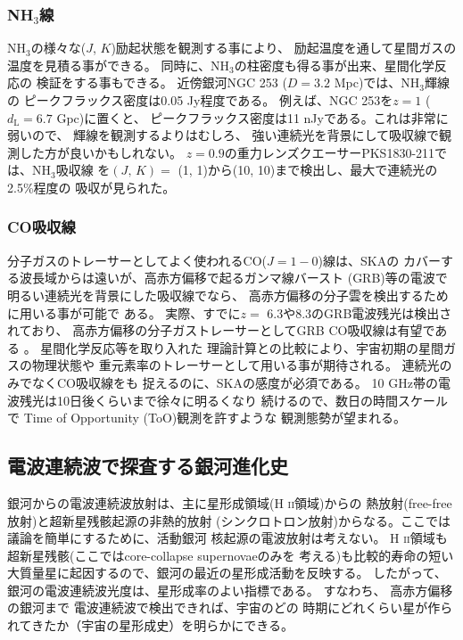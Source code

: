 \subsubsection{NH$_3$線}

NH$_3$の様々な($J$, $K$)励起状態を観測する事により、
励起温度を通して星間ガスの温度を見積る事ができる。
同時に、NH$_3$の柱密度も得る事が出来、星間化学反応の
検証をする事もできる。
近傍銀河NGC 253 ($D=3.2$ Mpc)では、NH$_3$輝線の
ピークフラックス密度は0.05 Jy程度である\citep{2005PASJ...57..549T}。
例えば、NGC 253を$z=1$ ($d_\mathrm{L}=6.7$ Gpc)に置くと、
ピークフラックス密度は11 nJyである。これは非常に弱いので、
輝線を観測するよりはむしろ、
強い連続光を背景にして吸収線で観測した方が良いかもしれない。
$z=0.9$の重力レンズクエーサーPKS1830-211では、NH$_3$吸収線
を$(J,\, K)=$ (1, 1)から(10, 10)まで検出し、最大で連続光の2.5\%程度の
吸収が見られた。

\subsubsection{CO吸収線}

分子ガスのトレーサーとしてよく使われるCO($J=1-0$)線は、SKAの
カバーする波長域からは遠いが、高赤方偏移で起るガンマ線バースト
(GRB)等の電波で明るい連続光を背景にした吸収線でなら、
高赤方偏移の分子雲を検出するために用いる事が可能で
ある\citep{2007MNRAS.380.1715I}。
実際、すでに$z=$ 6.3や8.3のGRB電波残光は検出されており、
高赤方偏移の分子ガストレーサーとしてGRB CO吸収線は有望である
\citep{2006ApJ...646L..99F,2010ApJ...712L..31C}。
星間化学反応等を取り入れた
理論計算との比較により、宇宙初期の星間ガスの物理状態や
重元素率のトレーサーとして用いる事が期待される。
連続光のみでなくCO吸収線をも
捉えるのに、SKAの感度が必須である。
10 GHz帯の電波残光は10日後くらいまで徐々に明るくなり
続ける\citep{2007MNRAS.380.1715I}ので、数日の時間スケールで
Time of Opportunity (ToO)観測を許すような
観測態勢が望まれる。 


\subsection{電波連続波で探査する銀河進化史}\label{sec:continuum}

銀河からの電波連続波放射は、主に星形成領域(H \textsc{ii}領域)からの
熱放射(free-free放射)と超新星残骸起源の非熱的放射
(シンクロトロン放射)からなる。ここでは議論を簡単にするために、活動銀河
核起源の電波放射は考えない。
H \textsc{ii}領域も超新星残骸(ここではcore-collapse supernovaeのみを
考える)も比較的寿命の短い大質量星に起因するので、銀河の最近の星形成活動を反映する。
したがって、
銀河の電波連続波光度は、星形成率のよい指標である\citep{1992ARA&A..30..575C}。
すなわち、
高赤方偏移の銀河まで
電波連続波で検出できれば、宇宙のどの
時期にどれくらい星が作られてきたか（宇宙の星形成史）を明らかにできる。

